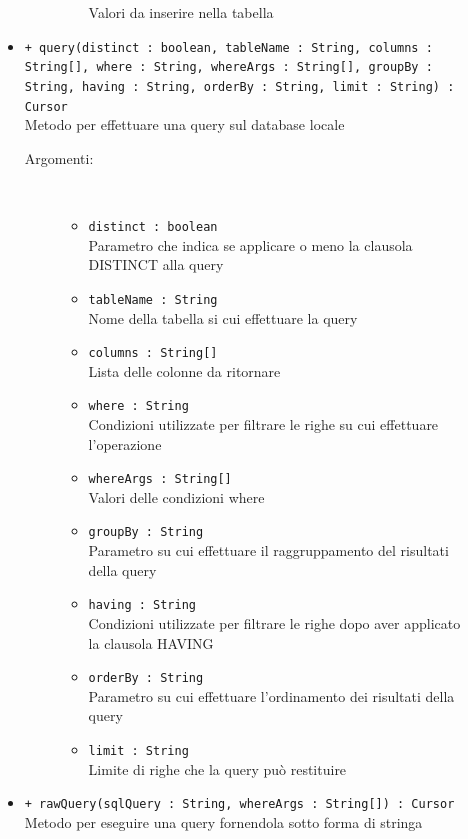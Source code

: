 \documentclass[../DefinizioneDiProdotto.tex]{subfiles}
\begin{document}
\begin{description}
\begin{itemize}
\begin{description}
\begin{itemize}
				Valori da inserire nella tabella\end{itemize}
		\end{description}
		\item \texttt{+ query(distinct : boolean, tableName : String, columns : String[], where : String, whereArgs : String[], groupBy : String, having : String, orderBy : String, limit : String) : Cursor}\\
		Metodo per effettuare una query sul database locale
		\begin{description}
			\item[Argomenti:] \
			\begin{itemize}
				\item \texttt{distinct : boolean}\\
				Parametro che indica se applicare o meno la clausola DISTINCT alla query\item \texttt{tableName : String}\\
				Nome della tabella si cui effettuare la query\item \texttt{columns : String[]}\\
				Lista delle colonne da ritornare\item \texttt{where : String}\\
				Condizioni utilizzate per filtrare le righe su cui effettuare l'operazione\item \texttt{whereArgs : String[]}\\
				Valori delle condizioni where\item \texttt{groupBy : String}\\
				Parametro su cui effettuare il raggruppamento del risultati della query\item \texttt{having : String}\\
				Condizioni utilizzate per filtrare le righe dopo aver applicato la clausola HAVING\item \texttt{orderBy : String}\\
				Parametro su cui effettuare l'ordinamento dei risultati della query\item \texttt{limit : String}\\
				Limite di righe che la query può restituire\end{itemize}
		\end{description}
		\item \texttt{+ rawQuery(sqlQuery : String, whereArgs : String[]) : Cursor}\\
		Metodo per eseguire una query fornendola sotto forma di stringa
		\begin{description}

\end{description}
\end{itemize}
\end{description}
\end{document}
